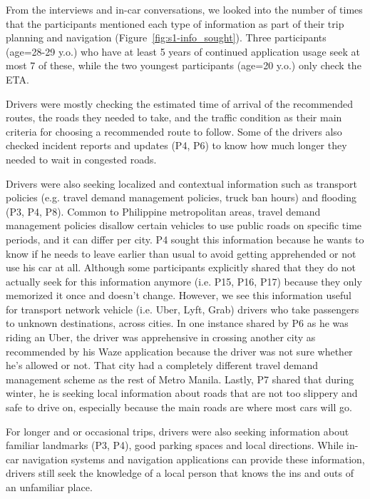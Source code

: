 From the interviews and in-car conversations, we looked into the number of times that the participants mentioned each type of information as part of their trip planning and navigation (Figure~\ref{fig:s1-info_sought}). Three participants (age=28-29 y.o.) who have at least 5 years of continued application usage seek at most 7 of these, while the two youngest participants (age=20 y.o.) only check the ETA.

Drivers were mostly checking the estimated time of arrival of the recommended routes, the roads they needed to take, and the traffic condition as their main criteria for choosing a recommended route to follow. Some of the drivers also checked incident reports and updates (P4, P6) to know how much longer they needed to wait in congested roads. 

Drivers were also seeking localized and contextual information such as transport policies (e.g. travel demand management policies, truck ban hours) and flooding (P3, P4, P8). Common to Philippine metropolitan areas, travel demand management policies disallow certain vehicles to use public roads on specific time periods, and it can differ per city. P4 sought this information because he wants to know if he needs to leave earlier than usual to avoid getting apprehended or not use his car at all. Although some participants explicitly shared that they do not actually seek for this information anymore (i.e. P15, P16, P17) because they only memorized it once and doesn't change. However, we see this information useful for transport network vehicle (i.e. Uber, Lyft, Grab) drivers who take passengers to unknown destinations, across cities. In one instance shared by P6 as he was riding an Uber, the driver was apprehensive in crossing another city as recommended by his Waze application because the driver was not sure whether he's allowed or not. That city had a completely different travel demand management scheme as the rest of Metro Manila. Lastly, P7 shared that during winter, he is seeking local information about roads that are not too slippery and safe to drive on, especially because the main roads are where most cars will go. 

For longer and or occasional trips, drivers were also seeking information about familiar landmarks (P3, P4), good parking spaces and local directions. While in-car navigation systems and navigation applications can provide these information, drivers still seek the knowledge of a local person that knows the ins and outs of an unfamiliar place. 

